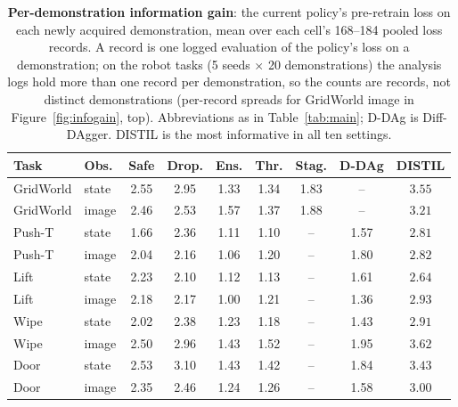 \documentclass[letterpaper]{article} %
\begin{document}
\begin{table}[t]
\centering
\small
\setlength{\tabcolsep}{2pt}
\caption{\textbf{Per-demonstration information gain}: the current policy's
pre-retrain loss on each newly acquired demonstration, mean over each
cell's 168--184 pooled loss records. A record is one logged evaluation of
the policy's loss on a demonstration; on the robot tasks (5 seeds
$\times$ 20 demonstrations) the analysis logs hold more than one record
per demonstration, so the counts are records, not distinct demonstrations
(per-record spreads for
GridWorld image in Figure~\ref{fig:infogain}, top). Abbreviations as in
Table~\ref{tab:main}; D-DAg is Diff-DAgger. DISTIL is the most informative
in all ten settings.}
\label{tab:infogain}
\begin{tabular}{llccccccc}
\toprule
Task & Obs. & Safe & Drop. & Ens. & Thr. & Stag. & D-DAg & DISTIL \\
\midrule
GridWorld & state & 2.55 & 2.95 & 1.33 & 1.34 & 1.83 & -- & $\mathbf{3.55}$ \\
GridWorld & image & 2.46 & 2.53 & 1.57 & 1.37 & 1.88 & -- & $\mathbf{3.21}$ \\
Push-T & state & 1.66 & 2.36 & 1.11 & 1.10 & -- & 1.57 & $\mathbf{2.81}$ \\
Push-T & image & 2.04 & 2.16 & 1.06 & 1.20 & -- & 1.80 & $\mathbf{2.82}$ \\
Lift & state & 2.23 & 2.10 & 1.12 & 1.13 & -- & 1.61 & $\mathbf{2.64}$ \\
Lift & image & 2.18 & 2.17 & 1.00 & 1.21 & -- & 1.36 & $\mathbf{2.93}$ \\
Wipe & state & 2.02 & 2.38 & 1.23 & 1.18 & -- & 1.43 & $\mathbf{2.91}$ \\
Wipe & image & 2.50 & 2.96 & 1.43 & 1.52 & -- & 1.95 & $\mathbf{3.62}$ \\
Door & state & 2.53 & 3.10 & 1.43 & 1.42 & -- & 1.84 & $\mathbf{3.43}$ \\
Door & image & 2.35 & 2.46 & 1.24 & 1.26 & -- & 1.58 & $\mathbf{3.00}$ \\
\bottomrule
\end{tabular}
\end{table}
\end{document}
